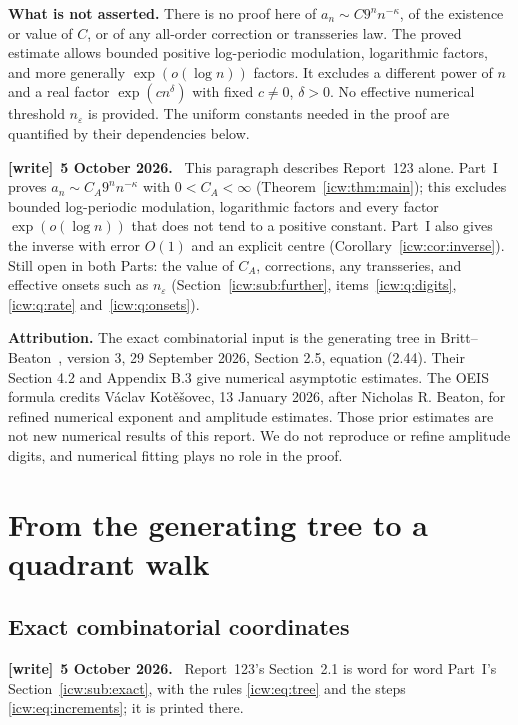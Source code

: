 \documentclass[11pt,letterpaper]{article}
\theoremstyle{remark}\newtheorem{remark}[theorem]{Remark}
\newcommand{\eps}{\varepsilon}
\newcommand{\1}{\mathbf1}
\newenvironment{writenote}[1][]{\par\smallskip\begingroup\small
 \noindent\textbf{[write]}\if\relax\detokenize{#1}\relax\else~\textbf{#1.}\fi\ }%
 {\par\endgroup\smallskip}
\begin{document}
\textbf{What is not asserted.}
There is no proof here of $a_n\sim C9^n n^{-\kappa}$, of the existence
or value of $C$, or of any all-order correction or transseries law.
The proved estimate allows bounded positive log-periodic modulation,
logarithmic factors, and more generally $\exp(o(\log n))$ factors.
It excludes a different power of $n$ and a real factor
$\exp(cn^\delta)$ with fixed $c\ne0$, $\delta>0$. No effective numerical
threshold $n_\eps$ is provided. The uniform constants needed in the proof
are quantified by their dependencies below.
\begin{writenote}[5 October 2026]
This paragraph describes Report~123 alone. Part~I proves $a_n\sim C_A9^nn^{-\kappa}$ with $0<C_A<\infty$ (Theorem~\ref{icw:thm:main}); this excludes bounded log-periodic modulation, logarithmic factors and every factor $\exp(o(\log n))$ that does not tend to a positive constant. Part~I also gives the inverse with error $O(1)$ and an explicit centre (Corollary~\ref{icw:cor:inverse}). Still open in both Parts: the value of $C_A$, corrections, any transseries, and effective onsets such as $n_\eps$ (Section~\ref{icw:sub:further}, items~\ref{icw:q:digits}, \ref{icw:q:rate} and~\ref{icw:q:onsets}).
\end{writenote}

\textbf{Attribution.}
The exact combinatorial input is the generating tree in
Britt--Beaton~\cite{bb}, version 3, 29 September 2026, Section 2.5,
equation (2.44). Their Section 4.2 and Appendix B.3 give numerical
asymptotic estimates. The OEIS formula credits V\'aclav Kot\v{e}\v{s}ovec,
13 January 2026, after Nicholas R. Beaton, for refined numerical exponent
and amplitude estimates. Those prior estimates are not new numerical
results of this report. We do not reproduce or refine amplitude digits,
and numerical fitting plays no role in the proof.

\section{From the generating tree to a quadrant walk}\label{icw:log:sec:tree}
\subsection{Exact combinatorial coordinates}\label{icw:log:sub:exact}
\begin{writenote}[5 October 2026]
Report~123's Section~2.1 is word for word Part~I's Section~\ref{icw:sub:exact}, with the rules \eqref{icw:eq:tree} and the steps \eqref{icw:eq:increments}; it is printed there.
\end{writenote}
\end{document}
